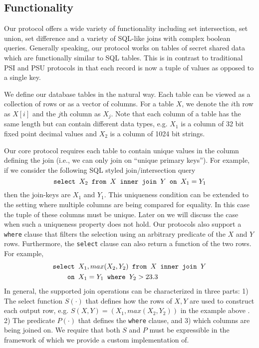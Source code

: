 \subsection{Functionality}

Our protocol offers a wide variety of functionality including set intersection, set union, set difference and a variety of SQL-like joins with complex boolean queries. Generally speaking, our protocol works on tables of secret shared data which are functionally similar to SQL tables. This is in contrast to traditional PSI and PSU protocols\cite{usenix:PSZ14,USENIX:PSSZ15,PSZ16,CCS:KKRT16} in that each record is now a tuple of values as opposed to a single key. 

We define our database tables in the natural way. Each table can be viewed as a collection of rows or as a vector of columns. For a table $X$, we denote the $i$th row as $X[i]$ and the $j$th column as $X_j$. 
\iffullversion
Note that each column of a table has the same length but can contain different data types, e.g. $X_1$ is a column of 32 bit fixed point decimal values and $X_2$ is a column of 1024 bit strings.

\fi
Our core protocol requires each table to contain unique values in the column defining the join  (i.e., we can only join on ``unique primary keys''). For example, if we consider the following SQL styled join/intersection query
\vspace{-0.1cm}
$$
\texttt{select } X_2 \texttt{ from } X \texttt{ inner join } Y \texttt{ on } X_1 = Y_1
\vspace{-0.1cm}
$$
then the join-keys are $X_1$ and $Y_1$. This uniqueness condition can be extended to the setting where multiple columns are being compared for equality. 
\iffullversion
In this case the tuple of these columns must be unique. 
\fi
Later on we will discuss the case when such a uniqueness property does not hold. Our protocols also support a \texttt{where} clause that filters the selection using an arbitrary predicate of the $X$ and $Y$ rows. Furthermore, the \texttt{select} clause can also return a function of the two rows. For example,
\vspace{-0.1cm}
\begin{align*}
\texttt{select }&  X_1,max(X_2, Y_2)  \texttt{ from } X \texttt{ inner join } Y \\
\texttt{on }& X_1 = Y_1 \texttt{ where } Y_2 > 23.3
\vspace{-0.1cm}
\end{align*}
In general, the supported join operations can be characterized in three parts: 1) The select function $S(\cdot)$ that defines how the rows of $X,Y$ are used to construct each output row, e.g. $S(X,Y)=(X_1, max(X_2,Y_2))$
\iffullversion
in the example above
\fi. 2) The predicate $P(\cdot)$ that defines the \texttt{where} clause, and 3) which columns are being joined on.
\iffullversion
 We require that both $S$ and $P$ must be expressible in the framework of \cite{aby3} which we provide a custom implementation of.
\fi

